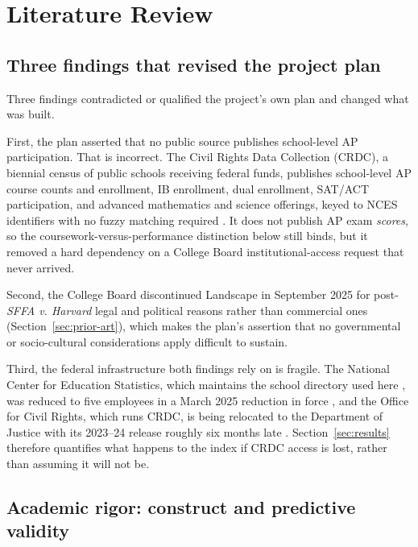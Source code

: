 \documentclass[12pt]{article}
\begin{document}
\section{Literature Review}
\label{sec:literature-review}

\subsection{Three findings that revised the project plan}

Three findings contradicted or qualified the project's own plan and changed what was built.

First, the plan asserted that no public source publishes school-level AP participation. That is incorrect. The Civil Rights Data Collection (CRDC), a biennial census of public schools receiving federal funds, publishes school-level AP course counts and enrollment, IB enrollment, dual enrollment, SAT/ACT participation, and advanced mathematics and science offerings, keyed to NCES identifiers with no fuzzy matching required \citep{ocr_crdc}. It does not publish AP exam \emph{scores}, so the coursework-versus-performance distinction below still binds, but it removed a hard dependency on a College Board institutional-access request that never arrived.

Second, the College Board discontinued Landscape in September 2025 for post-\textit{SFFA v. Harvard} legal and political reasons rather than commercial ones (Section~\ref{sec:prior-art}), which makes the plan's assertion that no governmental or socio-cultural considerations apply difficult to sustain.

Third, the federal infrastructure both findings rely on is fragile. The National Center for Education Statistics, which maintains the school directory used here \citep{nces_ccd}, was reduced to five employees in a March 2025 reduction in force \citep{palmer2025}, and the Office for Civil Rights, which runs CRDC, is being relocated to the Department of Justice with its 2023--24 release roughly six months late \citep{mehta2026}. Section~\ref{sec:results} therefore quantifies what happens to the index if CRDC access is lost, rather than assuming it will not be.

\subsection{Academic rigor: construct and predictive validity}
\label{sec:academic-rigor}
\end{document}
